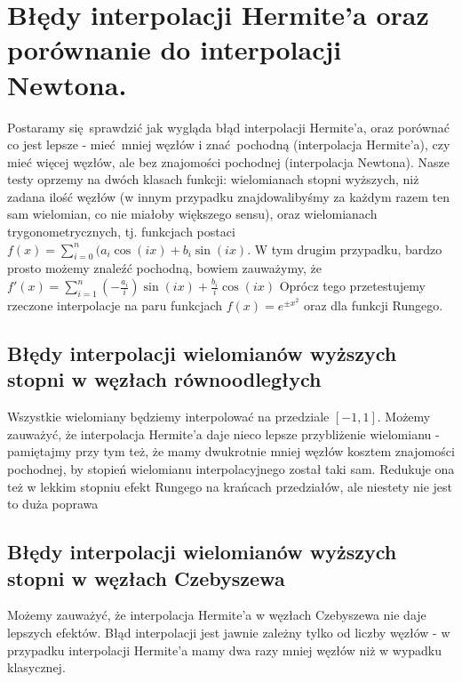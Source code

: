 \documentclass[10pt,wide]{mwart}
\theoremstyle{definition}
\begin{document}
\section{Błędy interpolacji Hermite'a oraz porównanie do interpolacji Newtona.}
Postaramy się sprawdzić jak wygląda błąd interpolacji Hermite'a, oraz porównać co jest lepsze -
mieć mniej węzłów i znać pochodną (interpolacja Hermite'a), czy mieć więcej węzłów, ale bez znajomości pochodnej (interpolacja Newtona).
Nasze testy oprzemy na dwóch klasach funkcji:
wielomianach stopni wyższych, niż zadana ilość węzłów
(w innym przypadku znajdowalibyśmy za każdym razem ten sam wielomian, co nie miałoby większego sensu),
oraz wielomianach trygonometrycznych, tj. funkcjach postaci \(f(x) = \sum_{i=0}^{n}(a_i\cos(ix) + b_i\sin(ix)\).
W tym drugim przypadku, bardzo prosto możemy znaleźć pochodną, bowiem zauważymy, że \(f'(x) = \sum_{i=1}^{n}(-\frac{a_i}{i})\sin(ix) + \frac{b_i}{i}\cos(ix)\)
Oprócz tego przetestujemy rzeczone interpolacje na paru funkcjach \(f(x) = e^{\pm x^2}\) oraz dla funkcji Rungego.
\subsection{Błędy interpolacji wielomianów wyższych stopni w węzłach równoodległych}
Wszystkie wielomiany będziemy interpolować na przedziale \([-1,1]\).
Możemy zauważyć, że interpolacja Hermite'a daje nieco lepsze przybliżenie wielomianu - pamiętajmy przy tym też, że mamy dwukrotnie mniej węzłów kosztem znajomości pochodnej, by stopień wielomianu interpolacyjnego został taki sam.
Redukuje ona też w lekkim stopniu efekt Rungego na krańcach przedziałów, ale niestety nie jest to duża poprawa
\subsection{Błędy interpolacji wielomianów wyższych stopni w węzłach Czebyszewa}
Możemy zauważyć, że interpolacja Hermite'a w węzłach Czebyszewa nie daje lepszych efektów.
Błąd interpolacji jest jawnie zależny tylko od liczby węzłów - w przypadku interpolacji Hermite'a mamy dwa razy mniej węzłów niż w wypadku klasycznej.
\end{document}
